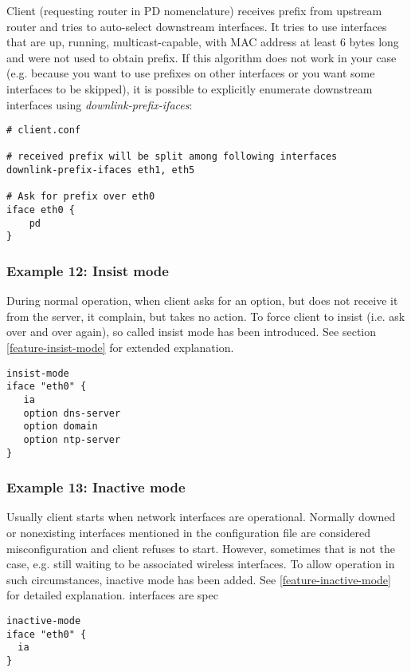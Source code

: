 Client (requesting router in PD nomenclature) receives prefix from
upstream router and tries to auto-select downstream interfaces. It
tries to use interfaces that are up, running, multicast-capable, with
MAC address at least 6 bytes long and were not used to obtain
prefix. If this algorithm does not work in your case (e.g. because you
want to use prefixes on other interfaces or you want some interfaces
to be skipped), it is possible to explicitly enumerate downstream
interfaces using \emph{downlink-prefix-ifaces}:

\begin{lstlisting}
# client.conf

# received prefix will be split among following interfaces
downlink-prefix-ifaces eth1, eth5

# Ask for prefix over eth0
iface eth0 {
    pd 
}
\end{lstlisting}


\subsubsection{Example 12: Insist mode}
\label{example-client-insistmode}
During normal operation, when client asks for an option, but does not
receive it from the server, it complain, but takes no action. To force
client to insist (i.e. ask over and over again), so called insist mode
has been introduced. See section \ref{feature-insist-mode} for
extended explanation.

\begin{lstlisting}
insist-mode
iface "eth0" {
   ia
   option dns-server
   option domain
   option ntp-server
}
\end{lstlisting}

\subsubsection{Example 13: Inactive mode}
\label{example-client-inactivemode}
Usually client starts when network interfaces are
operational. Normally downed or nonexisting interfaces mentioned in
the configuration file are considered misconfiguration and client
refuses to start. However, sometimes that is not the case, e.g. still
waiting to be associated wireless interfaces. To allow operation in
such circumstances, inactive mode has been added. See
\ref{feature-inactive-mode} for detailed explanation.
interfaces are spec

\begin{lstlisting}
inactive-mode
iface "eth0" {
  ia
}
\end{lstlisting}

